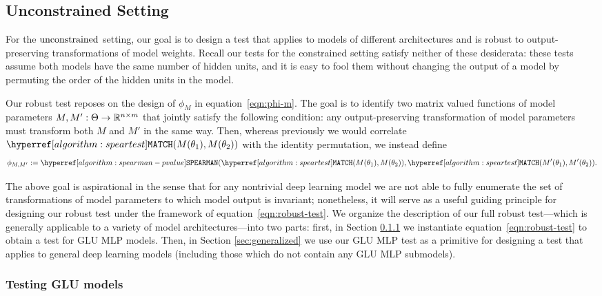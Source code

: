 {\subsection{Unconstrained Setting}
\label{robustness}

For the $\textup{unconstrained}$ setting, our goal is to design a test that applies to models of different architectures and is robust to output-preserving transformations of model weights.
Recall our tests for the constrained setting satisfy neither of these desiderata: these tests assume both models have the same number of hidden units, and it is easy to fool them without changing the output of a model by permuting the order of the hidden units in the model.

Our robust test reposes on the design of $\phi_M$ in equation~\eqref{eqn:phi-m}. The goal is to identify two matrix valued functions of model parameters $M,M' : \Theta \to \mathbb{R}^{n \times m}$ that jointly satisfy the following condition: any output-preserving transformation of model parameters must transform both $M$ and $M'$ in the same way. Then, whereas previously we would correlate $\speartest(M(\theta_1),M(\theta_2))$ with the identity permutation, we instead define
\begin{align}\label{eqn:robust-test}
    \phi_{M,M'} \defeq \spearman(\speartest(M(\theta_1),M(\theta_2)),\speartest(M'(\theta_1),M'(\theta_2)).
\end{align}

The above goal is aspirational in the sense that for any nontrivial deep learning model we are not able to fully enumerate the set of transformations of model parameters to which model output is invariant; 
nonetheless, it will serve as a useful guiding principle for designing our robust test under the framework of equation~\eqref{eqn:robust-test}.
We organize the description of our full robust test---which is generally applicable to a variety of model architectures---into two parts: first, in Section \ref{sec:gluarchitecture} we instantiate equation~\eqref{eqn:robust-test} to obtain a test for GLU MLP models. Then, in Section \ref{sec:generalized} we use our GLU MLP test as a primitive for designing a test that applies to general deep learning models (including those which do not contain any GLU MLP submodels).


\subsubsection{Testing GLU models}
\label{sec:gluarchitecture}


}
